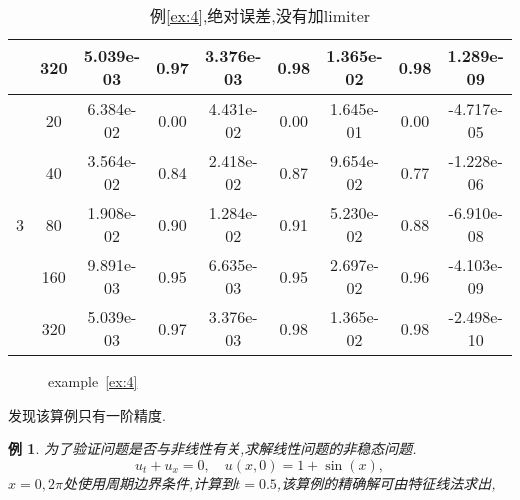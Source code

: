 \documentclass[a4paper, 11pt]{ctexart}
\numberwithin{equation}{section}
\numberwithin{figure}{section}
\newtheorem{example}{例}
\begin{document}
\begin{table}[H]
\begin{tabular}{c|c|c|c|c|c|c|c|c}
                     & 320 & 5.039e-03 & 0.97 & 3.376e-03 & 0.98 & 1.365e-02 & 0.98 & 1.289e-09   \\ \midrule
 \multirow{5}{*}{3}  &  20 & 6.384e-02 & 0.00 & 4.431e-02 & 0.00 & 1.645e-01 & 0.00 & -4.717e-05  \\
                     &  40 & 3.564e-02 & 0.84 & 2.418e-02 & 0.87 & 9.654e-02 & 0.77 & -1.228e-06  \\
                     &  80 & 1.908e-02 & 0.90 & 1.284e-02 & 0.91 & 5.230e-02 & 0.88 & -6.910e-08  \\
                     & 160 & 9.891e-03 & 0.95 & 6.635e-03 & 0.95 & 2.697e-02 & 0.96 & -4.103e-09  \\
                     & 320 & 5.039e-03 & 0.97 & 3.376e-03 & 0.98 & 1.365e-02 & 0.98 & -2.498e-10  \\ \bottomrule
  \end{tabular}
  \caption{例\ref{ex:4},绝对误差,没有加limiter}
\end{table}

\begin{figure}[H]
  \centering
\caption{example~\ref{ex:4}}
\end{figure}
发现该算例只有一阶精度.

\begin{example}\label{ex:10}
  为了验证问题是否与非线性有关,求解线性问题的非稳态问题.
\begin{equation}
  u_t+u_x=0,\quad u(x,0)=1+\sin(x),
\end{equation}
$x=0,2\pi$处使用周期边界条件,计算到$t=0.5$,该算例的精确解可由特征线法求出,
\end{example}
\end{document}
